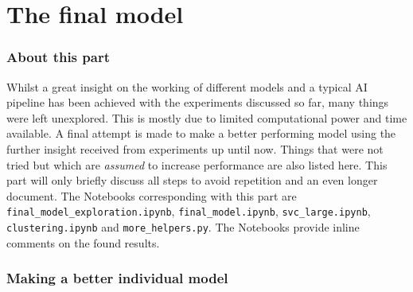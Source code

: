 \part{The final model}
\label{part:final_model}


\section{About this part}
\label{section:opt_about_part}

Whilst a great insight on the working of different models and a typical AI pipeline has been achieved with the experiments discussed so far, many things were left unexplored.
This is mostly due to limited computational power and time available.
A final attempt is made to make a better performing model using the further insight received from experiments up until now.
Things that were not tried but which are \textit{assumed} to increase performance are also listed here.
This part will only briefly discuss all steps to avoid repetition and an even longer document. 
The Notebooks corresponding with this part are \texttt{final\_model\_exploration.ipynb}, \texttt{final\_model.ipynb}, \texttt{svc\_large.ipynb},  \texttt{clustering.ipynb} and \texttt{more\_helpers.py}.
The Notebooks provide inline comments on the found results.


\section{Making a better individual model}
\label{section:opt_better_model}

